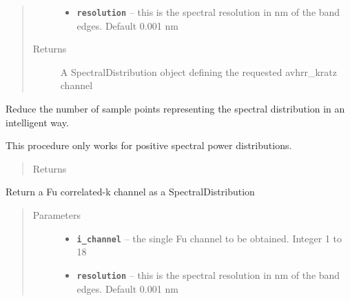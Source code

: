 \documentclass[a4paper,10pt,english]{sphinxmanual}
\begin{document}
\begin{fulllineitems}
\begin{fulllineitems}
\begin{quote}
\begin{description}
\begin{itemize}
\item {} 
\textbf{\texttt{resolution}} -- this is the spectral resolution in nm of the band edges. Default 0.001 nm

\end{itemize}

\item[{Returns}] \leavevmode
A SpectralDistribution object defining the requested avhrr\_kratz channel

\end{description}\end{quote}

\end{fulllineitems}


\begin{fulllineitems}
\label{packages:radute.SpectralDistribution.decimate_resolution}
Reduce the number of sample points representing the spectral distribution in an intelligent way.

This procedure only works for positive spectral power distributions.
\begin{quote}\begin{description}
\item[{Returns}] \leavevmode


\end{description}\end{quote}

\end{fulllineitems}


\begin{fulllineitems}
\label{packages:radute.SpectralDistribution.fu}
Return a Fu correlated-k channel as a SpectralDistribution
\begin{quote}\begin{description}
\item[{Parameters}] \leavevmode\begin{itemize}
\item {} 
\textbf{\texttt{i\_channel}} -- the single Fu channel to be obtained. Integer 1 to 18

\item {} 
\textbf{\texttt{resolution}} -- this is the spectral resolution in nm of the band edges. Default 0.001 nm


\end{itemize}
\end{description}
\end{quote}
\end{fulllineitems}
\end{fulllineitems}
\end{document}
